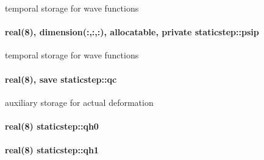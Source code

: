 temporal storage for wave functions 

\paragraph[{\texorpdfstring{psip}{psip}}]{\setlength{\rightskip}{0pt plus 5cm}real(8), dimension(\+:,\+:,\+:), allocatable, private staticstep\+::psip\hspace{0.3cm}{\ttfamily [private]}}\hypertarget{namespacestaticstep_af4d990f6823f777da64820a0c2b57616}{}\label{namespacestaticstep_af4d990f6823f777da64820a0c2b57616}


temporal storage for wave functions 

\paragraph[{\texorpdfstring{qc}{qc}}]{\setlength{\rightskip}{0pt plus 5cm}real(8), save staticstep\+::qc\hspace{0.3cm}{\ttfamily [private]}}\hypertarget{namespacestaticstep_ab1b2fd7b191b5100bb31d5b02df28d67}{}\label{namespacestaticstep_ab1b2fd7b191b5100bb31d5b02df28d67}


auxiliary storage for actual deformation 

\paragraph[{\texorpdfstring{qh0}{qh0}}]{\setlength{\rightskip}{0pt plus 5cm}real(8) staticstep\+::qh0\hspace{0.3cm}{\ttfamily [private]}}\hypertarget{namespacestaticstep_a41743f17b5730664e6c770a4d4ea2110}{}\label{namespacestaticstep_a41743f17b5730664e6c770a4d4ea2110}
\paragraph[{\texorpdfstring{qh1}{qh1}}]{\setlength{\rightskip}{0pt plus 5cm}real(8) staticstep\+::qh1\hspace{0.3cm}{\ttfamily [private]}}\hypertarget{namespacestaticstep_a91a6199d4eec95cff08b94738690894a}{}\label{namespacestaticstep_a91a6199d4eec95cff08b94738690894a}
